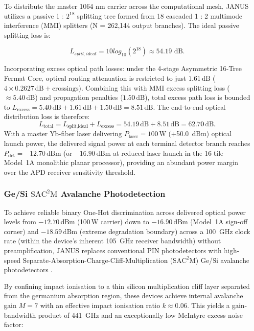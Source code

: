 \documentclass[journal]{IEEEtran}
\begin{document}
To distribute the master 1064 nm carrier across the computational mesh, JANUS utilizes a passive 1 : $2^{18}$ splitting tree formed from
18 cascaded 1 : 2 multimode interference (MMI) splitters (N = 262,144 output branches). The ideal passive splitting loss is:

\begin{equation}
L_{split,ideal} = 10 log_{10}(2^{18}) \approx 54.19 \text{ dB.}
\end{equation}

Incorporating excess optical path losses: under the 4-stage Asymmetric 16-Tree Fermat Core, optical routing attenuation is restricted to just $1.61\,\text{dB}$ ($4 \times 0.2627\,\text{dB} + \text{crossings}$). Combining this with MMI excess splitting loss ($\approx 5.40\,\text{dB}$) and propagation penalties ($1.50\,\text{dB}$), total excess path loss is bounded to $L_{\text{excess}} = 5.40\,\text{dB} + 1.61\,\text{dB} + 1.50\,\text{dB} = 8.51\,\text{dB}$. The end-to-end optical distribution loss is therefore:
\begin{equation}
L_{\text{total}} = L_{\text{split,ideal}} + L_{\text{excess}} = 54.19\,\text{dB} + 8.51\,\text{dB} = 62.70\,\text{dB}.
\end{equation}
With a master Yb-fiber laser delivering $P_{\text{laser}} = 100\,\text{W}$ (+50.0~dBm) optical launch power, the delivered signal power at each terminal detector branch reaches $P_{\text{det}} = -12.70\,\text{dBm}$ (or $-16.90\,\text{dBm}$ at reduced laser launch in the 16-tile Model~1A monolithic planar processor), providing an abundant power margin over the APD receiver sensitivity threshold.

\subsubsection{\textbf{Ge/Si $\mathrm{SAC^2M}$ Avalanche Photodetection}}

To achieve reliable binary One-Hot discrimination across delivered optical power levels from $-12.70\,\text{dBm}$ (100\,W carrier) down to $-16.90\,\text{dBm}$ (Model~1A sign-off corner) and $-18.59\,\text{dBm}$ (extreme degradation boundary) across a 100~GHz clock rate (within the device's inherent 105~GHz receiver bandwidth) without preamplification, JANUS replaces conventional PIN photodetectors with high-speed Separate-Absorption-Charge-Cliff-Multiplication ($\mathrm{SAC^2M}$) Ge/Si avalanche photodetectors \cite{Chen2025}. 

By confining impact ionisation to a thin silicon multiplication cliff layer separated from the germanium absorption region, these devices achieve internal avalanche gain $M = 7$ with an effective impact ionisation ratio $k \approx 0.06$. This yields a gain-bandwidth product of 441~GHz and an exceptionally low McIntyre excess noise factor:
\end{document}
